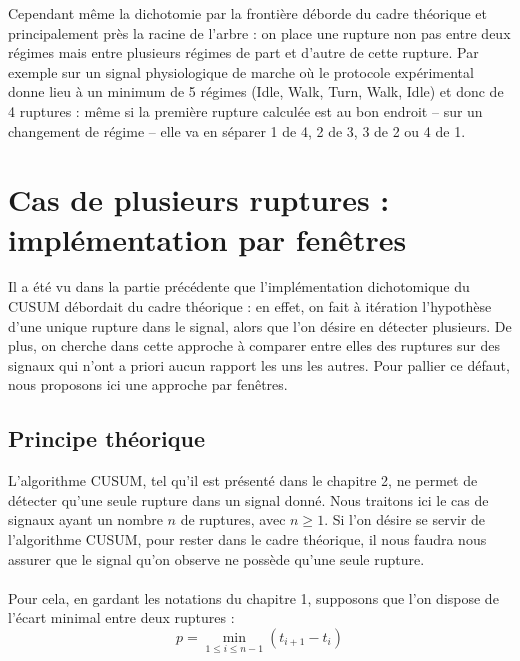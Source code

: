 \documentclass[french,11pt,notitlepage]{report}
\begin{document}
	Cependant même la dichotomie par la frontière déborde du cadre théorique et principalement près la racine de l'arbre :
	on place une rupture non pas entre deux régimes mais entre plusieurs régimes de part et d'autre de cette rupture.
	Par exemple sur un signal physiologique de marche où le protocole expérimental donne lieu à un minimum de 5 régimes (Idle, Walk, Turn, Walk, Idle) et donc de 4 ruptures :
	même si la première rupture calculée est au bon endroit -- sur un changement de régime --
	elle va en séparer 1 de 4, 2 de 3, 3 de 2 ou 4 de 1.
	
	\chapter{Cas de plusieurs ruptures : implémentation par fenêtres}	
	Il a été vu dans la partie précédente que l'implémentation dichotomique du CUSUM débordait du cadre théorique : en effet, on fait à itération l'hypothèse d'une unique rupture dans le signal, alors que l'on désire en détecter plusieurs. De plus, on cherche dans cette approche à comparer entre elles des ruptures sur des signaux qui n'ont a priori aucun rapport les uns les autres. Pour pallier ce défaut, nous proposons ici une approche par fenêtres.
	
	\section{Principe théorique}
	L'algorithme CUSUM, tel qu'il est présenté dans le chapitre 2, ne permet de détecter qu'une seule rupture dans un signal donné. Nous traitons ici le cas de signaux ayant un nombre $n$ de ruptures, avec $n \geq 1$. Si l'on désire se servir de l'algorithme CUSUM, pour rester dans le cadre théorique, il nous faudra nous assurer que le signal qu'on observe ne possède qu'une seule rupture.
	\\ \\
	Pour cela, en gardant les notations du chapitre 1, supposons que l'on dispose de l'écart minimal entre deux ruptures :
	\begin{equation*}
		p = \min_{1 \leq i \leq n-1} (t_{i+1} - t_i)
	\end{equation*}
	
\end{document}
